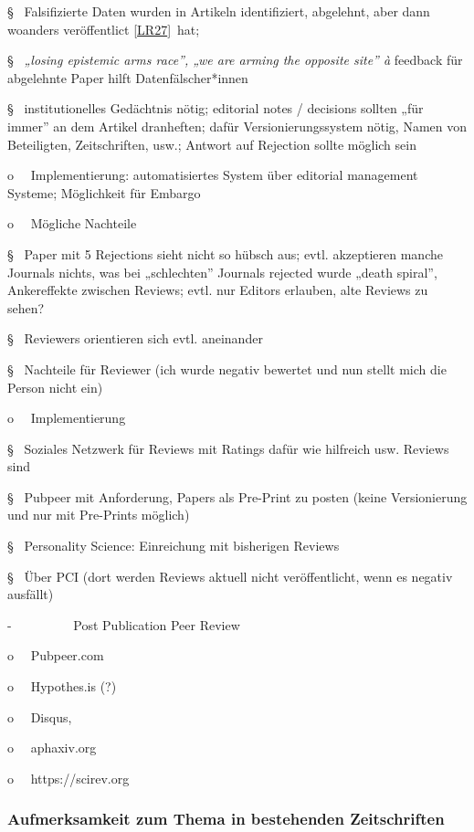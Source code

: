 \documentclass[
  letterpaper,
  DIV=11,
  numbers=noendperiod]{scrreprt}
\begin{document}
§~ Falsifizierte Daten wurden in Artikeln identifiziert, abgelehnt, aber
dann woanders veröffentlict \hyperref[_msocom_27]{{[}LR27{]}}~hat;

§~ \emph{„losing epistemic arms race'', „we are arming the opposite
site'' à} feedback für abgelehnte Paper hilft Datenfälscher*innen

§~ institutionelles Gedächtnis nötig; editorial notes / decisions
sollten „für immer'' an dem Artikel dranheften; dafür
Versionierungssystem nötig, Namen von Beteiligten, Zeitschriften, usw.;
Antwort auf Rejection sollte möglich sein

o~~ Implementierung: automatisiertes System über editorial management
Systeme; Möglichkeit für Embargo

o~~ Mögliche Nachteile

§~ Paper mit 5 Rejections sieht nicht so hübsch aus; evtl. akzeptieren
manche Journals nichts, was bei „schlechten'' Journals rejected wurde
„death spiral'', Ankereffekte zwischen Reviews; evtl. nur Editors
erlauben, alte Reviews zu sehen?

§~ Reviewers orientieren sich evtl. aneinander

§~ Nachteile für Reviewer (ich wurde negativ bewertet und nun stellt
mich die Person nicht ein)

o~~ Implementierung

§~ Soziales Netzwerk für Reviews mit Ratings dafür wie hilfreich usw.
Reviews sind

§~ Pubpeer mit Anforderung, Papers als Pre-Print zu posten (keine
Versionierung und nur mit Pre-Prints möglich)

§~ Personality Science: Einreichung mit bisherigen Reviews

§~ Über PCI (dort werden Reviews aktuell nicht veröffentlicht, wenn es
negativ ausfällt)

-~~~~~~~~~ Post Publication Peer Review

o~~ Pubpeer.com

o~~ Hypothes.is (?)

o~~ Disqus,

o~~ aphaxiv.org

o~~ https://scirev.org

\subsubsection{Aufmerksamkeit zum Thema in bestehenden
Zeitschriften}\label{aufmerksamkeit-zum-thema-in-bestehenden-zeitschriften}
\end{document}

